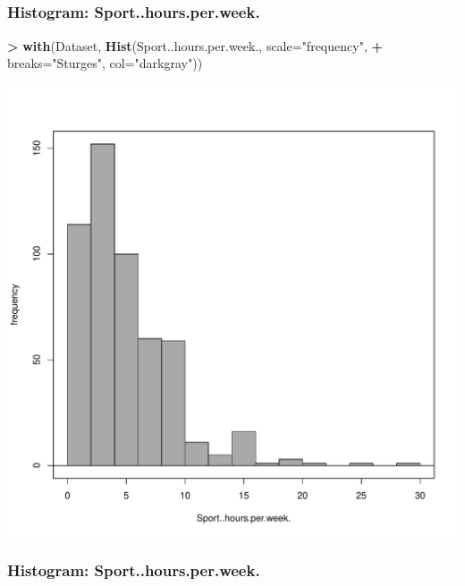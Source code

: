 \documentclass[
]{article}
\newenvironment{Shaded}{\begin{snugshade}}{\end{snugshade}}
\newcommand{\AttributeTok}[1]{\textcolor[rgb]{0.13,0.29,0.53}{#1}}
\newcommand{\FunctionTok}[1]{\textcolor[rgb]{0.13,0.29,0.53}{\textbf{#1}}}
\newcommand{\NormalTok}[1]{#1}
\newcommand{\SpecialCharTok}[1]{\textcolor[rgb]{0.81,0.36,0.00}{\textbf{#1}}}
\newcommand{\StringTok}[1]{\textcolor[rgb]{0.31,0.60,0.02}{#1}}
\begin{document}
\begin{verbatim}
                    
                    
                    
                    
\end{verbatim}

\subsubsection{Histogram:
Sport..hours.per.week.}\label{histogram-sport..hours.per.week.}

\begin{Shaded}
\begin{Highlighting}[]
\SpecialCharTok{\textgreater{}} \FunctionTok{with}\NormalTok{(Dataset, }\FunctionTok{Hist}\NormalTok{(Sport..hours.per.week., }\AttributeTok{scale=}\StringTok{"frequency"}\NormalTok{, }
\SpecialCharTok{+}   \AttributeTok{breaks=}\StringTok{"Sturges"}\NormalTok{, }\AttributeTok{col=}\StringTok{"darkgray"}\NormalTok{))}
\end{Highlighting}
\end{Shaded}

\includegraphics[width=750px]{RcmdrMarkdown_files/figure-latex/unnamed-chunk-8-1}

\subsubsection{Histogram:
Sport..hours.per.week.}\label{histogram-sport..hours.per.week.-1}
\end{document}
